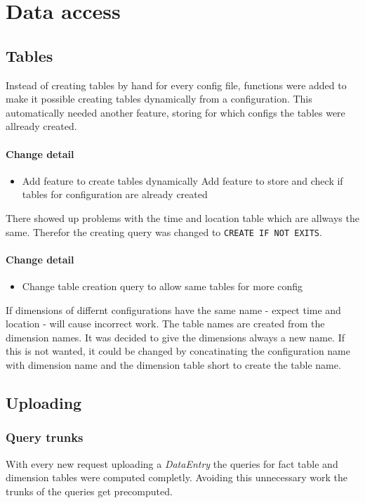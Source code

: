 \section{Data access}

\subsection{Tables}
Instead of creating tables by hand for every config file, functions
were added to make it possible creating tables dynamically from
a configuration. This automatically needed another feature,
storing for which configs the tables were allready created.

\paragraph{Change detail}
\begin{itemize}
  \item Add feature to create tables dynamically
  \itme Add feature to store and check if tables for configuration are already created
\end{itemize}

There showed up problems with the time and location table
which are allways the same. Therefor the creating query
was changed to \texttt{CREATE IF NOT EXITS}.

\paragraph{Change detail}
\begin{itemize}
  \item Change table creation query to allow same tables for more config
\end{itemize}

If dimensions of differnt configurations have the same name - expect time and location -
will cause incorrect work. The table names are created from the dimension names.
It was decided to give the dimensions always a new name. If this is
not wanted, it could be changed by concatinating
the configuration name with dimension name and the dimension table short
to create the table name.

\subsection{Uploading}
\subsubsection{Query trunks}
With every new request uploading a \textit{DataEntry} the queries 
for fact table and dimension tables were computed completly. Avoiding
this unnecessary work the trunks of the queries get precomputed.

